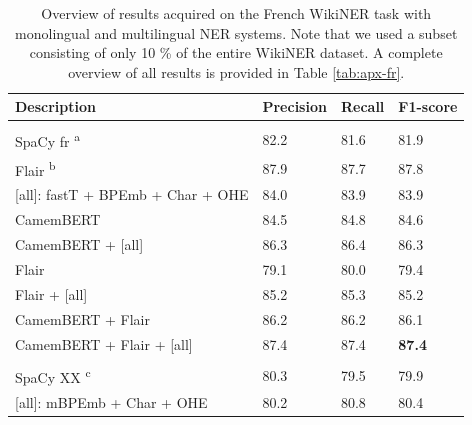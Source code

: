 \documentclass[12pt,a4paper,]{book}
\begin{document}
\begin{table}

\caption{\label{tab:wikiner-tab}Overview of results acquired on the French WikiNER task with monolingual and multilingual NER systems. Note that we used a subset consisting of only 10 \% of the entire WikiNER dataset. A complete overview of all results is provided in Table \ref{tab:apx-fr}.}
\centering
\begin{tabular}[t]{llll}
\toprule
Description & Precision & Recall & F1-score\\
\midrule
\addlinespace[0.3em]
\multicolumn{4}{l}{\textbf{Monolingual}}\\
\textcolor[HTML]{999999}{\hspace{1em}SpaCy fr \textsuperscript{a}} & \textcolor[HTML]{999999}{82.2} & \textcolor[HTML]{999999}{81.6} & \textcolor[HTML]{999999}{81.9}\\
\textcolor[HTML]{999999}{\hspace{1em}Flair \textsuperscript{b}} & \textcolor[HTML]{999999}{87.9} & \textcolor[HTML]{999999}{87.7} & \textcolor[HTML]{999999}{87.8}\\
\hspace{1em}[all]: fastT + BPEmb + Char + OHE & 84.0 & 83.9 & 83.9\\
\hspace{1em}CamemBERT & 84.5 & 84.8 & 84.6\\
\hspace{1em}CamemBERT + [all] & 86.3 & 86.4 & 86.3\\
\hspace{1em}Flair & 79.1 & 80.0 & 79.4\\
\hspace{1em}Flair + [all] & 85.2 & 85.3 & 85.2\\
\hspace{1em}CamemBERT + Flair & 86.2 & 86.2 & 86.1\\
\hspace{1em}CamemBERT + Flair + [all] & 87.4 & 87.4 & \textbf{87.4}\\
\addlinespace[0.3em]
\multicolumn{4}{l}{\textbf{Multilingual}}\\
\textcolor[HTML]{999999}{\hspace{1em}SpaCy XX \textsuperscript{c}} & \textcolor[HTML]{999999}{80.3} & \textcolor[HTML]{999999}{79.5} & \textcolor[HTML]{999999}{79.9}\\
\hspace{1em}[all]: mBPEmb + Char + OHE & 80.2 & 80.8 & 80.4\\

\end{tabular}
\end{table}
\end{document}
